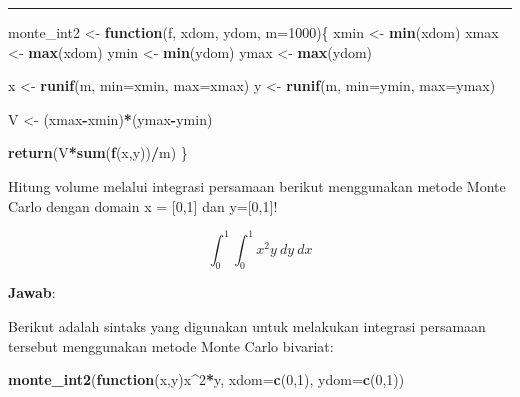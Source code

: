 \documentclass[]{book}
\newenvironment{Shaded}{\begin{snugshade}}{\end{snugshade}}
\newcommand{\ControlFlowTok}[1]{\textcolor[rgb]{0.13,0.29,0.53}{\textbf{#1}}}
\newcommand{\DataTypeTok}[1]{\textcolor[rgb]{0.13,0.29,0.53}{#1}}
\newcommand{\DecValTok}[1]{\textcolor[rgb]{0.00,0.00,0.81}{#1}}
\newcommand{\KeywordTok}[1]{\textcolor[rgb]{0.13,0.29,0.53}{\textbf{#1}}}
\newcommand{\NormalTok}[1]{#1}
\newcommand{\OperatorTok}[1]{\textcolor[rgb]{0.81,0.36,0.00}{\textbf{#1}}}
\newcommand{\StringTok}[1]{\textcolor[rgb]{0.31,0.60,0.02}{#1}}
\theoremstyle{definition}
\theoremstyle{definition}
\theoremstyle{definition}
\theoremstyle{remark}
\let\BeginKnitrBlock\begin \let\EndKnitrBlock\end
\begin{document}
\begin{center}\rule{0.5\linewidth}{\linethickness}\end{center}

\begin{Shaded}
\begin{Highlighting}[]
\NormalTok{monte_int2 <-}\StringTok{ }\ControlFlowTok{function}\NormalTok{(f, xdom, ydom, }\DataTypeTok{m=}\DecValTok{1000}\NormalTok{)\{}
\NormalTok{  xmin <-}\StringTok{ }\KeywordTok{min}\NormalTok{(xdom)}
\NormalTok{  xmax <-}\StringTok{ }\KeywordTok{max}\NormalTok{(xdom)}
\NormalTok{  ymin <-}\StringTok{ }\KeywordTok{min}\NormalTok{(ydom)}
\NormalTok{  ymax <-}\StringTok{ }\KeywordTok{max}\NormalTok{(ydom)}
  
\NormalTok{  x <-}\StringTok{ }\KeywordTok{runif}\NormalTok{(m, }\DataTypeTok{min=}\NormalTok{xmin, }\DataTypeTok{max=}\NormalTok{xmax)}
\NormalTok{  y <-}\StringTok{ }\KeywordTok{runif}\NormalTok{(m, }\DataTypeTok{min=}\NormalTok{ymin, }\DataTypeTok{max=}\NormalTok{ymax)}
  
\NormalTok{  V <-}\StringTok{ }\NormalTok{(xmax}\OperatorTok{-}\NormalTok{xmin)}\OperatorTok{*}\NormalTok{(ymax}\OperatorTok{-}\NormalTok{ymin)}
  
  \KeywordTok{return}\NormalTok{(V}\OperatorTok{*}\KeywordTok{sum}\NormalTok{(}\KeywordTok{f}\NormalTok{(x,y))}\OperatorTok{/}\NormalTok{m)}
\NormalTok{\}}
\end{Highlighting}
\end{Shaded}

\BeginKnitrBlock{example}
\protect\hypertarget{exm:monteexm2}{}{\label{exm:monteexm2} }Hitung volume melalui integrasi persamaan berikut menggunakan metode Monte Carlo dengan domain x = {[}0,1{]} dan y={[}0,1{]}!
\EndKnitrBlock{example}

\[
\int_{0}^1 \int_{0}^1 x^2y \ dy \ dx
\]

\textbf{Jawab}:

Berikut adalah sintaks yang digunakan untuk melakukan integrasi persamaan tersebut menggunakan metode Monte Carlo bivariat:

\begin{Shaded}
\begin{Highlighting}[]
\KeywordTok{monte_int2}\NormalTok{(}\ControlFlowTok{function}\NormalTok{(x,y)x}\OperatorTok{^}\DecValTok{2}\OperatorTok{*}\NormalTok{y,}
           \DataTypeTok{xdom=}\KeywordTok{c}\NormalTok{(}\DecValTok{0}\NormalTok{,}\DecValTok{1}\NormalTok{), }\DataTypeTok{ydom=}\KeywordTok{c}\NormalTok{(}\DecValTok{0}\NormalTok{,}\DecValTok{1}\NormalTok{))}
\end{Highlighting}
\end{Shaded}
\end{document}

